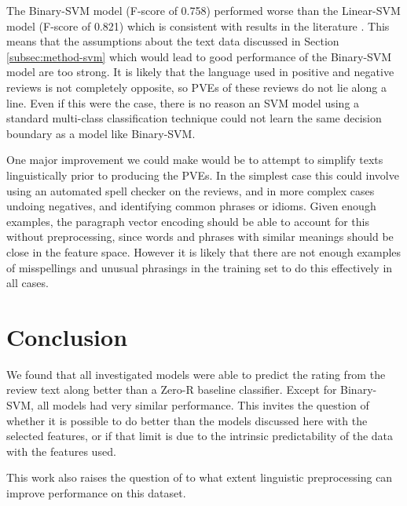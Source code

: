 \documentclass[11pt]{article}
\begin{document}
The Binary-SVM model (F-score of 0.758) performed worse than the Linear-SVM model (F-score of 0.821) which is consistent with results in the literature \cite{koppel_importance_2006}. This means that the assumptions about the text data discussed in Section \ref{subsec:method-svm} which would lead to good performance of the Binary-SVM model are too strong. It is likely that the language used in positive and negative reviews is not completely opposite, so PVEs of these reviews do not lie along a line. Even if this were the case, there is no reason an SVM model using a standard multi-class classification technique could not learn the same decision boundary as a model like Binary-SVM.

One major improvement we could make would be to attempt to simplify texts linguistically prior to producing the PVEs. In the simplest case this could involve using an automated spell checker on the reviews, and in more complex cases undoing negatives, and identifying common phrases or idioms. Given enough examples, the paragraph vector encoding should be able to account for this without preprocessing, since words and phrases with similar meanings should be close in the feature space. However it is likely that there are not enough examples of misspellings and unusual phrasings in the training set to do this effectively in all cases.

\section{Conclusion}
We found that all investigated models were able to predict the rating from the review text along better than a Zero-R baseline classifier. Except for Binary-SVM, all models had very similar performance. This invites the question of whether it is possible to do better than the models discussed here with the selected features, or if that limit is due to the intrinsic predictability of the data with the features used. 

This work also raises the question of to what extent linguistic preprocessing can improve performance on this dataset.


\nocite{mukherjee_what_2013}
\nocite{rayana_collective_2015}

\nocite{sklearn_pedregosa_scikit-learn_2011}
\nocite{gensim_rehurek_software_2010}


\end{document}
